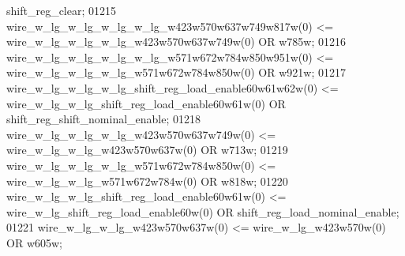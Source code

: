 \begin{DoxyCode}
{{      shift_reg_clear};
01215     \textcolor{vhdlchar}{wire_w_lg_w_lg_w_lg_w_lg_w423w570w637w749w817w}\textcolor{vhdlchar}{(}\textcolor{vhdllogic}{}\textcolor{vhdllogic}{0}\textcolor{vhdlchar}{)} \textcolor{vhdlchar}{<=} \textcolor{vhdlchar}{
      wire_w_lg_w_lg_w_lg_w423w570w637w749w}\textcolor{vhdlchar}{(}\textcolor{vhdllogic}{}\textcolor{vhdllogic}{0}\textcolor{vhdlchar}{)} \textcolor{keywordflow}{OR} \textcolor{vhdlchar}{w785w};
01216     \textcolor{vhdlchar}{wire_w_lg_w_lg_w_lg_w_lg_w571w672w784w850w951w}\textcolor{vhdlchar}{(}\textcolor{vhdllogic}{}\textcolor{vhdllogic}{0}\textcolor{vhdlchar}{)} \textcolor{vhdlchar}{<=} \textcolor{vhdlchar}{
      wire_w_lg_w_lg_w_lg_w571w672w784w850w}\textcolor{vhdlchar}{(}\textcolor{vhdllogic}{}\textcolor{vhdllogic}{0}\textcolor{vhdlchar}{)} \textcolor{keywordflow}{OR} \textcolor{vhdlchar}{w921w};
01217     \textcolor{vhdlchar}{wire_w_lg_w_lg_w_lg_shift_reg_load_enable60w61w62w}\textcolor{vhdlchar}{(}\textcolor{vhdllogic}{}\textcolor{vhdllogic}{0}\textcolor{vhdlchar}{)} \textcolor{vhdlchar}{<=} \textcolor{vhdlchar}{
      wire_w_lg_w_lg_shift_reg_load_enable60w61w}\textcolor{vhdlchar}{(}\textcolor{vhdllogic}{}\textcolor{vhdllogic}{0}\textcolor{vhdlchar}{)} \textcolor{keywordflow}{OR} \textcolor{vhdlchar}{shift_reg_shift_nominal_enable};
01218     \textcolor{vhdlchar}{wire_w_lg_w_lg_w_lg_w423w570w637w749w}\textcolor{vhdlchar}{(}\textcolor{vhdllogic}{}\textcolor{vhdllogic}{0}\textcolor{vhdlchar}{)} \textcolor{vhdlchar}{<=} \textcolor{vhdlchar}{wire_w_lg_w_lg_w423w570w637w}\textcolor{vhdlchar}{(}\textcolor{vhdllogic}{}\textcolor{vhdllogic}{0}\textcolor{vhdlchar}{)} \textcolor{keywordflow}{OR} \textcolor{vhdlchar}{
      w713w};
01219     \textcolor{vhdlchar}{wire_w_lg_w_lg_w_lg_w571w672w784w850w}\textcolor{vhdlchar}{(}\textcolor{vhdllogic}{}\textcolor{vhdllogic}{0}\textcolor{vhdlchar}{)} \textcolor{vhdlchar}{<=} \textcolor{vhdlchar}{wire_w_lg_w_lg_w571w672w784w}\textcolor{vhdlchar}{(}\textcolor{vhdllogic}{}\textcolor{vhdllogic}{0}\textcolor{vhdlchar}{)} \textcolor{keywordflow}{OR} \textcolor{vhdlchar}{
      w818w};
01220     \textcolor{vhdlchar}{wire_w_lg_w_lg_shift_reg_load_enable60w61w}\textcolor{vhdlchar}{(}\textcolor{vhdllogic}{}\textcolor{vhdllogic}{0}\textcolor{vhdlchar}{)} \textcolor{vhdlchar}{<=} \textcolor{vhdlchar}{
      wire_w_lg_shift_reg_load_enable60w}\textcolor{vhdlchar}{(}\textcolor{vhdllogic}{}\textcolor{vhdllogic}{0}\textcolor{vhdlchar}{)} \textcolor{keywordflow}{OR} \textcolor{vhdlchar}{shift_reg_load_nominal_enable};
01221     \textcolor{vhdlchar}{wire_w_lg_w_lg_w423w570w637w}\textcolor{vhdlchar}{(}\textcolor{vhdllogic}{}\textcolor{vhdllogic}{0}\textcolor{vhdlchar}{)} \textcolor{vhdlchar}{<=} \textcolor{vhdlchar}{wire_w_lg_w423w570w}\textcolor{vhdlchar}{(}\textcolor{vhdllogic}{}\textcolor{vhdllogic}{0}\textcolor{vhdlchar}{)} \textcolor{keywordflow}{OR} \textcolor{vhdlchar}{w605w};
}
\end{DoxyCode}
